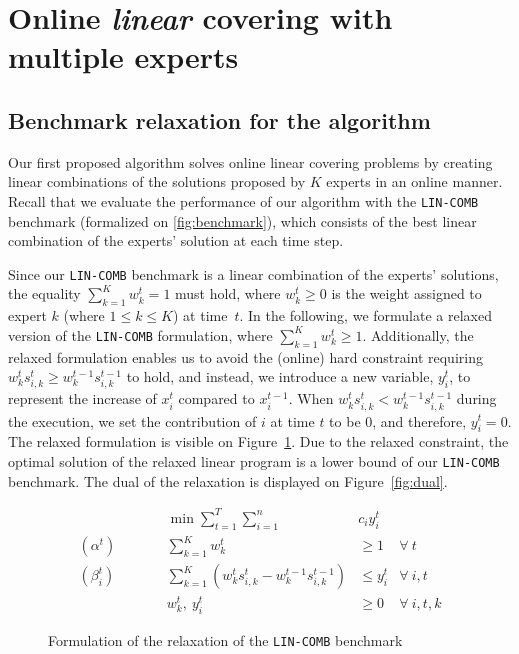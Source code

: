 
\section{Online \emph{linear} covering with multiple experts}	\label{sec:covering}

\subsection{Benchmark relaxation for the algorithm}

Our first proposed algorithm solves online linear covering problems by creating linear combinations of the solutions proposed by $K$ experts in an online manner.
Recall that we evaluate the performance of our algorithm with the \texttt{LIN-COMB} benchmark (formalized on \cref{fig:benchmark}), which consists of the best linear combination of the experts' solution at each time step.

Since our \texttt{LIN-COMB} benchmark is a linear combination of the experts' solutions, the equality $ \sum_{k=1}^{K} w_{k}^{t} = 1$ must hold, where $w_{k}^{t} \geq 0$ is the weight assigned to expert $k$ (where $1 \leq k \leq K$) at time~$t$. In the following, we formulate a relaxed version of the \texttt{LIN-COMB} formulation, where
$\sum_{k=1}^{K} w_{k}^{t} \geq 1$. Additionally, the relaxed formulation enables us to avoid the (online) hard constraint requiring $w_{k}^{t} s_{i,k}^{t} \geq w_{k}^{t-1} s_{i,k}^{t-1}$ to hold, and instead, we introduce a new variable, $y_{i}^{t}$, to represent the increase of $x_{i}^{t}$ compared to $x_{i}^{t-1}$. When $w_{k}^{t} s_{i,k}^{t} < w_{k}^{t-1} s_{i,k}^{t-1}$ during the execution, we set the contribution of $i$ at time $t$ to be 0, and therefore, $y_{i}^{t} = 0$.
The relaxed formulation is visible on Figure~\ref{fig:relaxation}. Due to the relaxed constraint, the optimal solution of the relaxed linear program is a lower bound of our \texttt{LIN-COMB} benchmark. The dual of the relaxation is displayed on Figure~\ref{fig:dual}.


\begin{figure}[ht]
	\begin{mdframed}
		\begin{align*}
			&& \min \sum_{t = 1}^{T} \sum_{i=1}^{n} & c_i y_i^t \\
			(\alpha^{t}) \qquad && \sum_{k=1}^{K} w_{k}^{t} & \geq 1  & \forall\ t \\
			(\beta_{i}^{t}) \qquad && \sum_{k=1}^{K} \left(w_{k}^{t} s_{i,k}^{t} - w_{k}^{t-1} s_{i,k}^{t-1} \right) &\leq y_i^t  &\forall\ i,t\\
			&& w_{k}^{t},\ y_{i}^{t} & \ge 0 & \forall\ i,t,k
		\end{align*}
	\end{mdframed}
	\caption{Formulation of the relaxation of the \texttt{LIN-COMB} benchmark}
	\label{fig:relaxation}
\end{figure}


